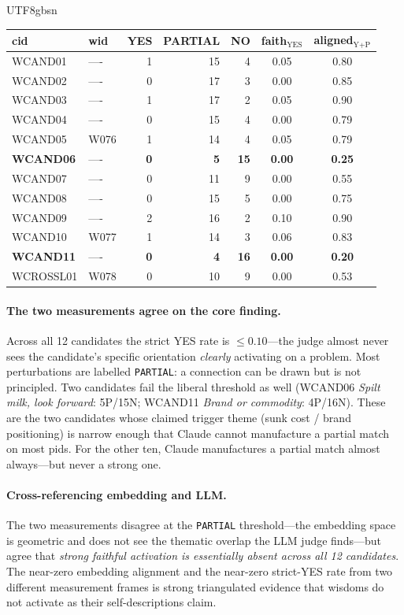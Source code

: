 \documentclass{article}
\begin{document}
\begin{CJK*}{UTF8}{gbsn}
\begin{center}\small
\begin{tabular}{l l r r r c c}
  \toprule
  cid & wid & YES & PARTIAL & NO & faith\(_{\text{YES}}\) & aligned\(_{\text{Y+P}}\) \\
  \midrule
  WCAND01 & ---- & 1 & 15 & 4 & 0.05 & 0.80 \\
  WCAND02 & ---- & 0 & 17 & 3 & 0.00 & 0.85 \\
  WCAND03 & ---- & 1 & 17 & 2 & 0.05 & 0.90 \\
  WCAND04 & ---- & 0 & 15 & 4 & 0.00 & 0.79 \\
  WCAND05 & W076 & 1 & 14 & 4 & 0.05 & 0.79 \\
  \textbf{WCAND06} & ---- & \textbf{0} & \textbf{5} & \textbf{15} & \textbf{0.00} & \textbf{0.25} \\
  WCAND07 & ---- & 0 & 11 & 9 & 0.00 & 0.55 \\
  WCAND08 & ---- & 0 & 15 & 5 & 0.00 & 0.75 \\
  WCAND09 & ---- & 2 & 16 & 2 & 0.10 & 0.90 \\
  WCAND10 & W077 & 1 & 14 & 3 & 0.06 & 0.83 \\
  \textbf{WCAND11} & ---- & \textbf{0} & \textbf{4} & \textbf{16} & \textbf{0.00} & \textbf{0.20} \\
  WCROSSL01 & W078 & 0 & 10 & 9 & 0.00 & 0.53 \\
  \bottomrule
\end{tabular}
\end{center}

\paragraph{The two measurements agree on the core finding.}
Across all 12 candidates the strict YES rate is
\(\leq 0.10\)—the judge almost never sees the candidate's
specific orientation \emph{clearly} activating on a problem.
Most perturbations are labelled \texttt{PARTIAL}: a connection
can be drawn but is not principled. Two candidates fail the
liberal threshold as well (WCAND06 \emph{Spilt milk, look
forward}: 5P/15N; WCAND11 \emph{Brand or commodity}: 4P/16N).
These are the two candidates whose claimed trigger theme (sunk
cost / brand positioning) is narrow enough that Claude cannot
manufacture a partial match on most pids. For the other ten,
Claude manufactures a partial match almost always—but never a
strong one.

\paragraph{Cross-referencing embedding and LLM.} The two
measurements disagree at the \texttt{PARTIAL} threshold—the
embedding space is geometric and does not see the thematic
overlap the LLM judge finds—but agree that \emph{strong
faithful activation is essentially absent across all 12
candidates}. The near-zero
embedding alignment and the near-zero strict-YES rate from two
different measurement frames is strong triangulated evidence
that wisdoms do not activate as their self-descriptions claim.


\end{CJK*}
\end{document}
